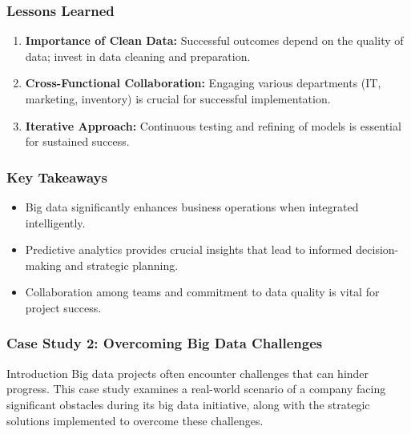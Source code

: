 \documentclass[aspectratio=169]{beamer}
\begin{document}
\begin{frame}[fragile]
    \frametitle{Lessons Learned}

    \begin{enumerate}
        \item \textbf{Importance of Clean Data:} Successful outcomes depend on the quality of data; invest in data cleaning and preparation.
        \item \textbf{Cross-Functional Collaboration:} Engaging various departments (IT, marketing, inventory) is crucial for successful implementation.
        \item \textbf{Iterative Approach:} Continuous testing and refining of models is essential for sustained success.
    \end{enumerate}
\end{frame}

\begin{frame}[fragile]
    \frametitle{Key Takeaways}

    \begin{itemize}
        \item Big data significantly enhances business operations when integrated intelligently.
        \item Predictive analytics provides crucial insights that lead to informed decision-making and strategic planning.
        \item Collaboration among teams and commitment to data quality is vital for project success.
    \end{itemize}
\end{frame}

\begin{frame}[fragile]
    \frametitle{Case Study 2: Overcoming Big Data Challenges}
    \begin{block}{Introduction}
        Big data projects often encounter challenges that can hinder progress. This case study examines 
        a real-world scenario of a company facing significant obstacles during its big data initiative, 
        along with the strategic solutions implemented to overcome these challenges.
    \end{block}
\end{frame}
\end{document}
